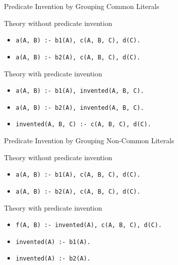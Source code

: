 \documentclass[presentation]{beamer}\mode<presentation>{\usetheme{AMSBolognaFC}}
\begin{document}
\begin{frame}{Predicate Invention by Grouping Common Literals}

    \begin{block}{Theory without predicate invention}%
        \begin{itemize}
            \item \texttt{a(A, B) :- b1(A), \alert{c(A, B, C), d(C)}.}
            \item \texttt{a(A, B) :- b2(A), \alert{c(A, B, C), d(C)}.}
        \end{itemize}
    \end{block}

    \begin{exampleblock}{Theory with predicate invention}
        \begin{itemize}
            \item \texttt{a(A, B) :- b1(A), invented(A, B, C).}
            \item \texttt{a(A, B) :- b2(A), invented(A, B, C).}
            \item \texttt{invented(A, B, C) :- \alert{c(A, B, C), d(C)}.}
        \end{itemize}
    \end{exampleblock}

\end{frame}

\begin{frame}{Predicate Invention by Grouping Non-Common Literals}

    \begin{block}{Theory without predicate invention}%
        \begin{itemize}
            \item \texttt{a(A, B) :- \alert{b1(A)}, c(A, B, C), d(C).}
            \item \texttt{a(A, B) :- \alert{b2(A)}, c(A, B, C), d(C).}
        \end{itemize}
    \end{block}
    
    \begin{exampleblock}{Theory with predicate invention}%
        \begin{itemize}
            \item \texttt{f(A, B) :- invented(A), c(A, B, C), d(C).}
            \item \texttt{invented(A) :- \alert{b1(A)}.}
            \item \texttt{invented(A) :- \alert{b2(A)}.}
        \end{itemize}
    \end{exampleblock} 
\end{frame}
\end{document}
